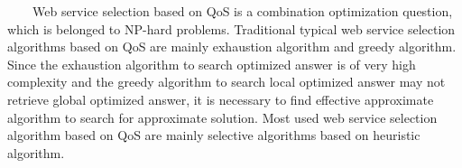 \documentclass[senior,final,11pt]{iscs-thesis}
\begin{document}
~~~~Web service selection based on QoS is a combination optimization question, which is belonged to NP-hard problems. Traditional typical web service selection algorithms based on QoS are mainly exhaustion algorithm and greedy algorithm. Since the exhaustion algorithm to search optimized answer is of very high complexity and the greedy algorithm to search local optimized answer may not retrieve global optimized answer, it is necessary to find effective approximate algorithm to search for approximate solution. Most used web service selection algorithm based on QoS are mainly selective algorithms based on heuristic algorithm.
\end{document}

